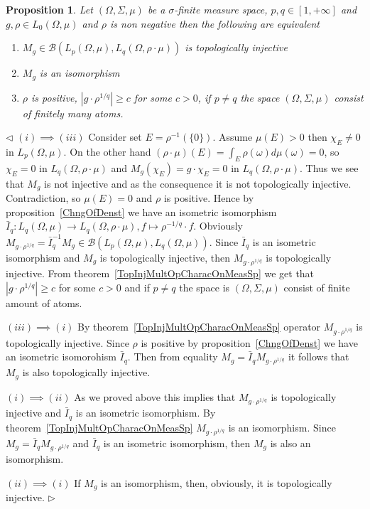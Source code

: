 \documentclass[12pt]{article}
\newtheorem{proposition}[theorem]{Proposition}
\newenvironment{proof}{\par $\triangleleft$}{$\triangleright$}
\begin{document}
\begin{proposition}\label{TopInjMultOpCharacBtwnTwoContMeasSp}
    Let $(\Omega,\Sigma,\mu)$ be a $\sigma$-finite measure space,
    $p,q\in[1,+\infty]$ and $g,\rho\in L_0(\Omega,\mu)$ and $\rho$ is non
    negative then the following are equivalent
    \begin{enumerate}[label = (\roman*)]
        \item $M_g\in\mathcal{B}(L_p(\Omega,\mu),L_q(\Omega,\rho\cdot\mu))$ is
              topologically injective

        \item $M_g$ is an isomorphism

        \item $\rho$ is  positive, $|g\cdot \rho^{1/q}|\geq c$ for some
              $c>0$, if $p\neq q$ the space $(\Omega,\Sigma,\mu)$ consist
              of finitely many atoms.
    \end{enumerate}
\end{proposition}
\begin{proof} $(i)\implies (iii)$ Consider set $E=\rho^{-1}( \{0 \})$.
    Assume $\mu(E)>0$ then $\chi_E\neq 0$ in $L_p(\Omega,\mu)$. On the other
    hand $(\rho\cdot\mu)(E)=\int_E\rho(\omega)d\mu(\omega)=0$, so $\chi_E=0$ in
    $L_q(\Omega,\rho\cdot\mu)$ and $M_g(\chi_E)=g\cdot\chi_E=0$ in
    $L_q(\Omega,\rho\cdot\mu)$. Thus we see that $M_g$ is not injective and as
    the consequence it is not topologically injective. Contradiction, so
    $\mu(E)=0$ and $\rho$ is  positive. Hence by proposition~\ref{ChngOfDenst}
    we have an isometric isomorphism
    $\bar{I}_q:L_q(\Omega,\mu)\to L_q(\Omega,\rho\cdot\mu),
        f\mapsto \rho^{-1/q}\cdot f$. Obviously
    $M_{g\cdot\rho^{1/q}}
        =\bar{I}_q^{-1} M_g\in\mathcal{B}(L_p(\Omega,\mu),L_q(\Omega,\mu))$. 
    Since $\bar{I}_q$ is an isometric isomorphism and $M_g$ is topologically
    injective, then $M_{g\cdot \rho^{1/q}}$ is topologically injective. From
    theorem~\ref{TopInjMultOpCharacOnMeasSp} we get that
    $|g\cdot\rho^{1/q}|\geq c$ for some $c>0$ and if $p\neq q$ the space
    is $(\Omega,\Sigma,\mu)$ consist of finite amount of atoms.

    $(iii)\implies (i)$ By theorem~\ref{TopInjMultOpCharacOnMeasSp} operator
    $M_{g\cdot\rho^{1/q}}$ is topologically injective. Since $\rho$ is positive
    by proposition~\ref{ChngOfDenst} we have an isometric isomorohism
    $\bar{I}_q$. Then from equality $M_g=\bar{I}_q M_{g\cdot\rho^{1/q}}$ it
    follows that $M_g$ is also topologically injective.

    $(i)\implies (ii)$ As we proved above this implies that
    $M_{g\cdot\rho^{1/q}}$ is topologically injective and $\bar{I}_q$ is an
    isometric isomorphism. By theorem~\ref{TopInjMultOpCharacOnMeasSp}
    $M_{g\cdot\rho^{1/q}}$ is an isomorphism. Since
    $M_g=\bar{I}_q M_{g\cdot\rho^{1/q}}$ and $\bar{I}_q$ is an isometric
    isomorphism, then $M_g$ is also an isomorphism.

    $(ii)\implies (i)$ If $M_g$ is an isomorphism, then, obviously, it is
    topologically injective.
\end{proof}
\end{document}
